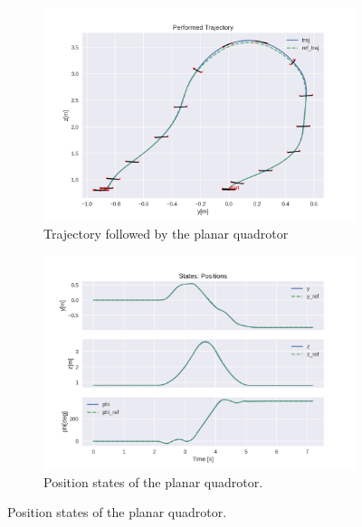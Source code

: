 \documentclass{thesisreport}
\begin{document}
\begin{figure}[H]
	\begin{subfigure}{0.48\textwidth}
		\includegraphics[width=\linewidth]{Images/acados_simulations/flip_trajectory/planar_quadrotor/noiseless/sim.png}
		\caption{Trajectory followed by the planar quadrotor} \label{fig:flip_planar_sim_2d_noiseless}
	\end{subfigure}\hspace*{\fill}
	\begin{subfigure}{0.48\textwidth}
		\includegraphics[width=\linewidth]{Images/acados_simulations/flip_trajectory/planar_quadrotor/noiseless/posStates.png}
		\caption{Position states of the planar quadrotor.} \label{fig:flip_planar_sim_pose_noiseless}
	\end{subfigure}


\end{figure}
\end{document}
